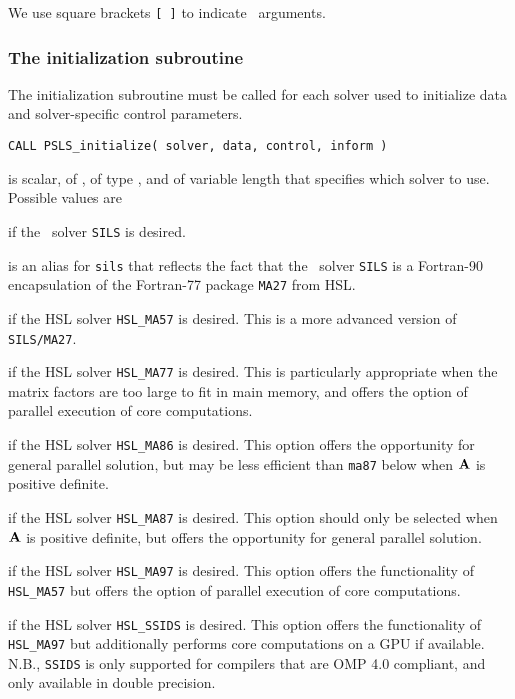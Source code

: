 \documentclass{galahad}
\newcommand{\packagename}{PSLS}
\begin{document}

\galarguments
We use square brackets {\tt [ ]} to indicate \optional\ arguments.


\subsubsection{The initialization subroutine}\label{subinit}
The initialization subroutine must be called for each solver used
to initialize data and solver-specific control parameters.

\hskip0.5in
{\tt CALL \packagename\_initialize( solver, data, control, inform )}
\begin{description}

 is scalar, of \intentin, of type \character, and of variable
length that specifies which solver to use. Possible values are
\begin{description}
 if the \galahad\ solver {\tt SILS} is desired.

 is an alias for {\tt sils} that reflects the fact that the \galahad\
 solver {\tt SILS} is a Fortran-90 encapsulation of the Fortran-77
 package {\tt MA27} from HSL.

 if the HSL solver {\tt HSL\_MA57} is desired. This is a more
advanced version of {\tt SILS/MA27}.

 if the HSL solver {\tt HSL\_MA77} is desired. This is particularly
appropriate when the matrix factors are too large to fit in main memory,
and offers the option of parallel execution of core computations.

 if the HSL solver {\tt HSL\_MA86} is desired. This option
offers the opportunity for general parallel solution, but may be
less efficient than {\tt ma87} below when ${\mathbf{A}}$ is positive definite.

 if the HSL solver {\tt HSL\_MA87} is desired. This option should
only be selected when ${\mathbf{A}}$ is positive definite, but
offers the opportunity for general parallel solution.

 if the HSL solver {\tt HSL\_MA97} is desired. This option offers
the functionality of {\tt HSL\_MA57} but offers the option of parallel
execution of core computations.

 if the HSL solver {\tt HSL\_SSIDS} is desired. This option offers
the functionality of {\tt HSL\_MA97} but additionally performs
core computations on a GPU if available. N.B., {\tt SSIDS} is only
supported for compilers that are OMP 4.0 compliant, and only available
in double precision.


\end{description}
\end{description}
\end{document}
